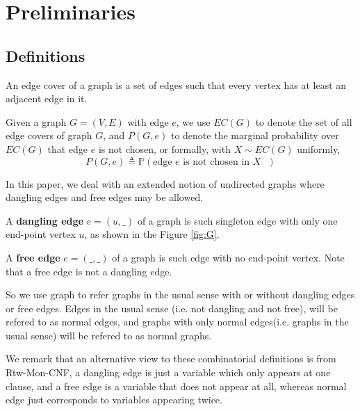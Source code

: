 
\section{Preliminaries}
\subsection{Definitions}
An edge cover of a graph is a set of edges such that every vertex has at least an adjacent edge in it.

Given a graph $G=(V,E)$ with edge $e$,  we use $EC(G)$ to denote the set of all edge covers of graph $G$, and $P(G, e)$ to denote the marginal probability over $EC(G)$ that edge $e$ is not chosen, or formally, with $X \sim EC(G)$ uniformly,
\begin{equation}
	P(G, e) \triangleq \mathbb{P} \left(\textrm{edge $e$ is not chosen in $X$ } \right)
	\label{defpge}
\end{equation}

In this paper, we deal with an extended notion of undirected graphs where dangling edges and free edges may be allowed.
\begin{Def}
	A {\bf dangling edge} $e=(u,\_)$ of a graph is such singleton edge with only one end-point vertex $u$, as shown in the Figure \ref{fig:G}.

	A {\bf free edge} $e=(\_, \_)$ of a graph is such edge with no end-point vertex. Note that a free edge is not a dangling edge.

%

\end{Def}

	So we use graph to refer graphs in the usual sense with or without dangling edges or free edges.
	Edges in the usual sense (i.e. not dangling and not free), will be refered to as normal edges,
	and graphs with only normal edges(i.e. graphs in the usual sense) will be refered to as normal graphs.

	We remark that an alternative view to these combinatorial definitions is from Rtw-Mon-CNF,
	a dangling edge is just a variable which only appears at one clause, and a free edge is a variable
	that does not appear at all, whereas normal edge just corresponds to variables appearing twice.


